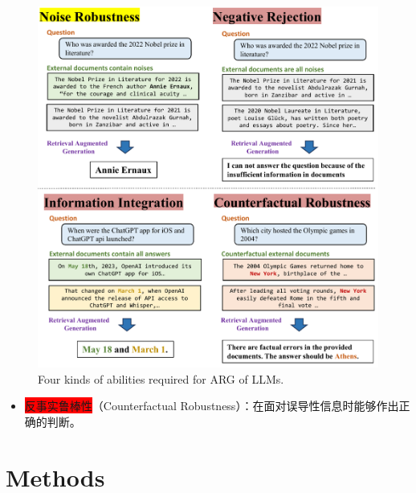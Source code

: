 \documentclass{beamer}
\begin{document}
\begin{frame}
    \begin{figure}[h]
        \centering
        \includegraphics[height=.75\textheight]{./images/figures/intro.pdf}
        \caption{Four kinds of abilities required for ARG of LLMs.}
    \end{figure}
    \begin{itemize}
        \item {\colorbox{red}{反事实鲁棒性}（Counterfactual Robustness）：在面对误导性信息时能够作出正确的判断。}
    \end{itemize}
\end{frame}

\section{Methods}
\end{document}
